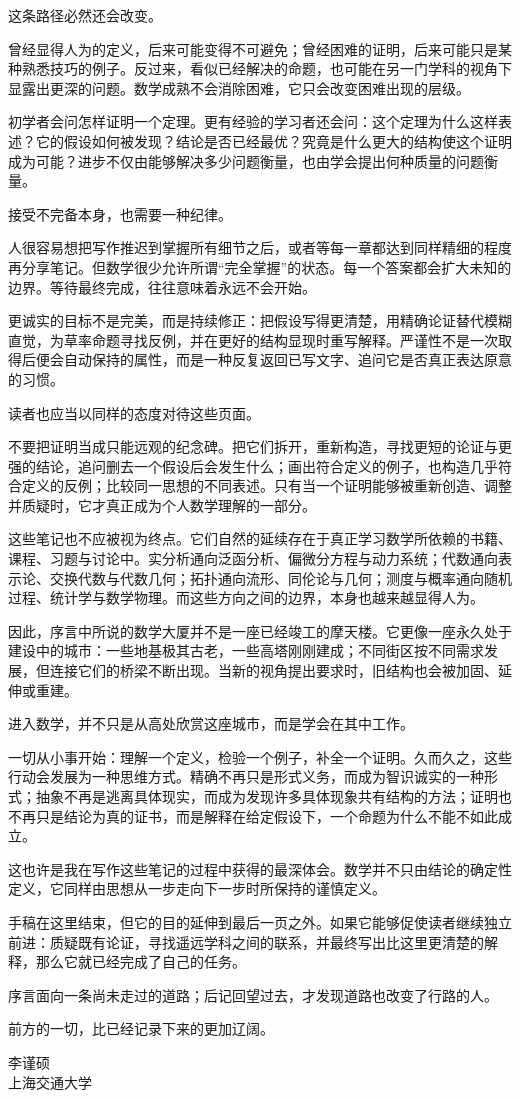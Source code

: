 这条路径必然还会改变。

曾经显得人为的定义，后来可能变得不可避免；曾经困难的证明，后来可能只是某种熟悉技巧的例子。反过来，看似已经解决的命题，也可能在另一门学科的视角下显露出更深的问题。数学成熟不会消除困难，它只会改变困难出现的层级。

初学者会问怎样证明一个定理。更有经验的学习者还会问：这个定理为什么这样表述？它的假设如何被发现？结论是否已经最优？究竟是什么更大的结构使这个证明成为可能？进步不仅由能够解决多少问题衡量，也由学会提出何种质量的问题衡量。

接受不完备本身，也需要一种纪律。

人很容易想把写作推迟到掌握所有细节之后，或者等每一章都达到同样精细的程度再分享笔记。但数学很少允许所谓“完全掌握”的状态。每一个答案都会扩大未知的边界。等待最终完成，往往意味着永远不会开始。

更诚实的目标不是完美，而是持续修正：把假设写得更清楚，用精确论证替代模糊直觉，为草率命题寻找反例，并在更好的结构显现时重写解释。严谨性不是一次取得后便会自动保持的属性，而是一种反复返回已写文字、追问它是否真正表达原意的习惯。

读者也应当以同样的态度对待这些页面。

不要把证明当成只能远观的纪念碑。把它们拆开，重新构造，寻找更短的论证与更强的结论，追问删去一个假设后会发生什么；画出符合定义的例子，也构造几乎符合定义的反例；比较同一思想的不同表述。只有当一个证明能够被重新创造、调整并质疑时，它才真正成为个人数学理解的一部分。

这些笔记也不应被视为终点。它们自然的延续存在于真正学习数学所依赖的书籍、课程、习题与讨论中。实分析通向泛函分析、偏微分方程与动力系统；代数通向表示论、交换代数与代数几何；拓扑通向流形、同伦论与几何；测度与概率通向随机过程、统计学与数学物理。而这些方向之间的边界，本身也越来越显得人为。

因此，序言中所说的数学大厦并不是一座已经竣工的摩天楼。它更像一座永久处于建设中的城市：一些地基极其古老，一些高塔刚刚建成；不同街区按不同需求发展，但连接它们的桥梁不断出现。当新的视角提出要求时，旧结构也会被加固、延伸或重建。

进入数学，并不只是从高处欣赏这座城市，而是学会在其中工作。

一切从小事开始：理解一个定义，检验一个例子，补全一个证明。久而久之，这些行动会发展为一种思维方式。精确不再只是形式义务，而成为智识诚实的一种形式；抽象不再是逃离具体现实，而成为发现许多具体现象共有结构的方法；证明也不再只是结论为真的证书，而是解释在给定假设下，一个命题为什么不能不如此成立。

这也许是我在写作这些笔记的过程中获得的最深体会。数学并不只由结论的确定性定义，它同样由思想从一步走向下一步时所保持的谨慎定义。

手稿在这里结束，但它的目的延伸到最后一页之外。如果它能够促使读者继续独立前进：质疑既有论证，寻找遥远学科之间的联系，并最终写出比这里更清楚的解释，那么它就已经完成了自己的任务。

序言面向一条尚未走过的道路；后记回望过去，才发现道路也改变了行路的人。

前方的一切，比已经记录下来的更加辽阔。

\begin{flushright}
李谨硕 \\
上海交通大学
\end{flushright}

\cleardoublepage
